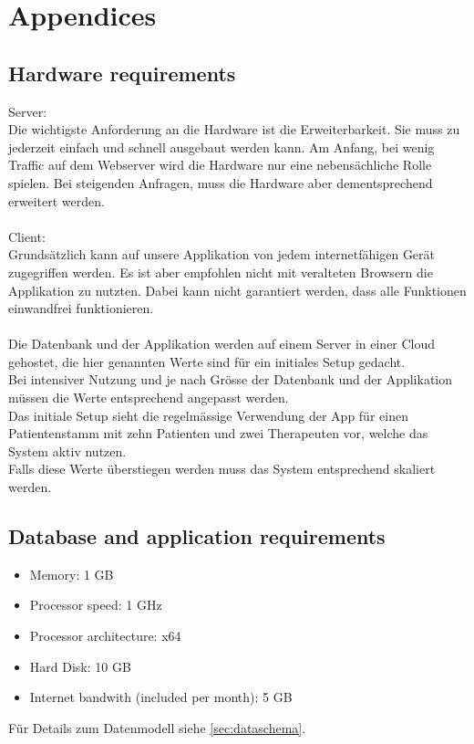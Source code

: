 \chapter{Appendices}

\section{Hardware requirements}
Server: \\
Die wichtigste Anforderung an die Hardware ist die Erweiterbarkeit. Sie muss zu jederzeit einfach und schnell ausgebaut werden kann. Am Anfang, bei wenig Traffic auf dem Webserver wird die Hardware nur eine nebens\"{a}chliche Rolle spielen. Bei steigenden Anfragen, muss die Hardware aber dementsprechend erweitert werden. \\ \\

Client: \\
Grunds\"{a}tzlich kann auf unsere Applikation von jedem internetf\"{a}higen Ger\"{a}t zugegriffen werden. Es ist aber empfohlen nicht mit veralteten Browsern die Applikation zu nutzten. Dabei kann nicht garantiert werden, dass alle Funktionen einwandfrei funktionieren. \\ \\

Die Datenbank und der Applikation werden auf einem Server in einer Cloud gehostet, die hier genannten Werte sind f\"{u}r ein initiales Setup gedacht. \\
Bei intensiver Nutzung und je nach Gr\"{o}sse der Datenbank und der Applikation m\"{u}ssen die Werte entsprechend angepasst werden. \\
Das initiale Setup sieht die regelm\"{a}ssige Verwendung der App f\"{u}r einen Patientenstamm mit zehn Patienten und zwei Therapeuten vor, welche das System aktiv nutzen. \\
Falls diese Werte \"{u}berstiegen werden muss das System entsprechend skaliert werden.

\section{Database and application requirements}

\begin{itemize}
    \item{Memory: 1 GB}
    \item{Processor speed: 1 GHz}
    \item{Processor architecture: x64}
    \item{Hard Disk: 10 GB}
    \item{Internet bandwith (included per month): 5 GB}
\end{itemize}

F\"{u}r Details zum Datenmodell siehe \ref{sec:dataschema}.
